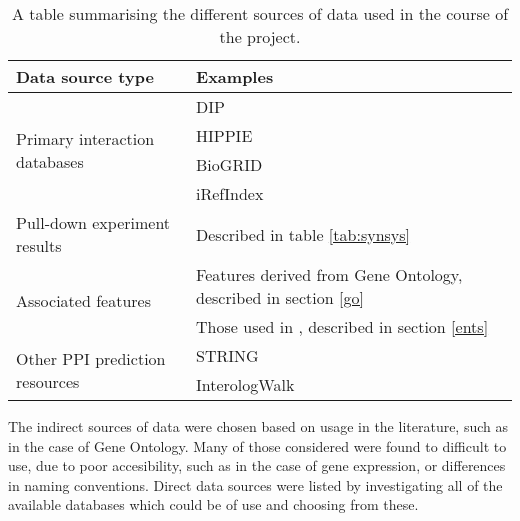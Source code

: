 \begin{table}
    \centering
    \small
    \begin{tabular}{p{} p{}}
        Data source type                                & Examples \\
        \hline
        \multirow{4}{*}{\parbox{0.2\textwidth}{Primary interaction databases}}  & \ac{DIP}\autocite{xenarios_dip_2002} \\
                                                        & \ac{HIPPIE}\autocite{schaefer_hippie:_2012} \\ 
                                                        & BioGRID\autocite{stark_biogrid:_2006} \\
                                                        & iRefIndex\autocite{razick_irefindex:_2008}  \\
        \hline
        Pull-down experiment results                    & Described in table \ref{tab:synsys} \\
        \hline
        \multirow{2}{*}{\parbox{0.2\textwidth}{Associated features}}            & Features derived from Gene Ontology\autocite{ashburner_gene_2000}, described in section \ref{go} \\
                                                                                & Those used in \textcite{rodgers-melnick_predicting_2013}, described in section \ref{ents} \\
        \hline
        \multirow{2}{*}{\parbox{0.2\textwidth}{Other \ac{PPI} prediction resources}} & \ac{STRING}\autocite{von_mering_string:_2005} \\
                                                        & InterologWalk\autocite{gallone_bio::homology::interologwalk_2011} \\
    \end{tabular}
    \caption{A table summarising the different sources of data used in the course of the project.}
    \label{tab:sources}
\end{table}

The indirect sources of data were chosen based on usage in the literature, such as in the case of Gene Ontology\autocite{qi_evaluation_2006}. 
Many of those considered were found to difficult to use, due to poor accesibility, such as in the case of gene expression, or differences in naming conventions.
Direct data sources were listed by investigating all of the available databases which could be of use and choosing from these.

